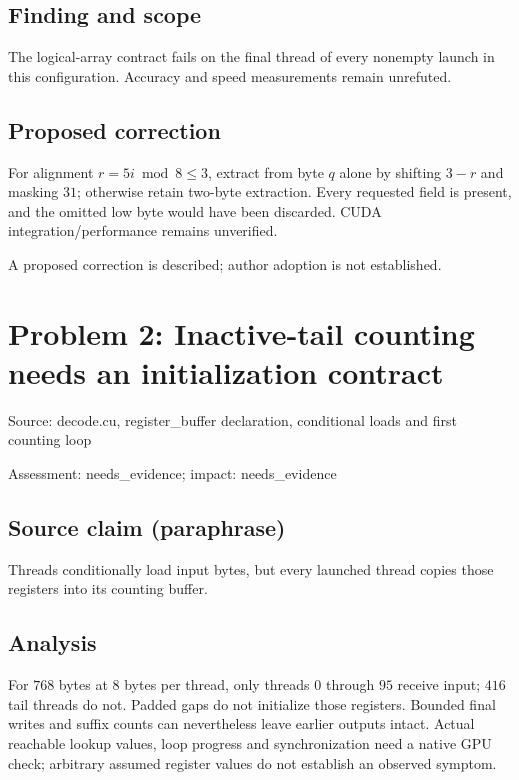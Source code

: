 \documentclass[11pt]{article}
\begin{document}
\subsection*{Finding and scope}

The logical-array contract fails on the final thread of every nonempty launch in this configuration. Accuracy and speed measurements remain unrefuted.

\subsection*{Proposed correction}

For alignment \(r=5i\bmod8\le3\), extract from byte \(q\) alone by shifting \(3-r\) and masking \(31\); otherwise retain two-byte extraction. Every requested field is present, and the omitted low byte would have been discarded. CUDA integration/performance remains unverified.

A proposed correction is described; author adoption is not established.

\section*{Problem 2: Inactive-tail counting needs an initialization contract}

Source: decode.cu, register\_buffer declaration, conditional loads and first counting loop

Assessment: needs\_evidence; impact: needs\_evidence

\subsection*{Source claim (paraphrase)}

Threads conditionally load input bytes, but every launched thread copies those registers into its counting buffer.

\subsection*{Analysis}

For \(768\) bytes at \(8\) bytes per thread, only threads \(0\) through \(95\) receive input; \(416\) tail threads do not. Padded gaps do not initialize those registers. Bounded final writes and suffix counts can nevertheless leave earlier outputs intact. Actual reachable lookup values, loop progress and synchronization need a native GPU check; arbitrary assumed register values do not establish an observed symptom.
\end{document}
